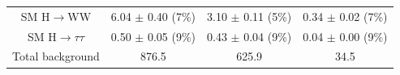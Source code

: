 \begin{table}[h!]
\begin{center}
{\begin{tabular}{c c c c }
 SM H$\to$WW           &      6.04 $\pm$       0.40  (7\%)              &       3.10 $\pm$       0.11 (5\%)             &      0.34 $\pm$       0.02 (7\%)               \\
 
 SM H$\to\tau\tau$                &      0.50 $\pm$       0.05 (9\%)              &       0.43 $\pm$       0.04 (9\%)             &      0.04 $\pm$       0.00 (9\%)               \\
      
\midrule
    Total background          &    876.5               &     625.9           &     34.5          \\
\bottomrule
\end{tabular}
}
\end{center}
\end{table}

